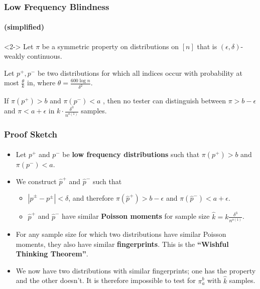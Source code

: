 \documentclass{beamer}
\begin{document}
\begin{frame}
  \frametitle{Low Frequency Blindness} \framesubtitle{(simplified)}
  \begin{theorem}<2->
    Let $\pi$ be a symmetric property on distributions on $[n]$ that
    is $(\epsilon,\delta)$-weakly continuous.

    Let $p^+,p^-$ be two distributions for which all indices occur
    with probability at most $\frac{\theta}{k}$ in, where
    $\theta=\frac{600\log n}{\delta^2}$.

    If $\pi(p^+)>b$ and $\pi(p^-)<a$ , then no tester can distinguish
    between $\pi>b-\epsilon$ and $\pi<a+\epsilon$ in $k\cdot
    \frac{\delta^3}{n^{o(1)}}$ samples.
  \end{theorem}
\end{frame}


\begin{frame}
  \frametitle{Proof Sketch} \framesubtitle{}

  \begin{itemize}
  \item<1-> Let $p^+$ and $p^-$ be {\bf low frequency distributions}
    such that $\pi(p^+)>b$ and $\pi(p^-)<a$.
  \item<2-> We construct $\hat{p}^+$ and $\hat{p}^-$ such that
    \begin{itemize}
    \item<3-> $|\hat{p}^\pm-p^\pm|<\delta$, and therefore
      $\pi(\hat{p}^+)>b-\epsilon$ and
      $\pi(\hat{p}^-)<a+\epsilon$.
    \item<4->$\hat{p}^+$ and $\hat{p}^-$ have similar {\bf Poisson
        moments} for sample size $\hat{k}=k\frac{\delta^3}{n^{o(1)}}$.
    \end{itemize}
  \item<5-> For any sample size for which two distributions have similar
    Poisson moments, they also have similar {\bf fingerprints}. This
    is the {\bf ``Wishful Thinking Theorem''}.
  \item<6-> We now have two distributions with similar fingerprints;
    one has the property and the other doesn't. It is therefore
    impossible to test for $\pi_a^b$ with $\hat{k}$ samples.
  \end{itemize}

\end{frame}
\end{document}

